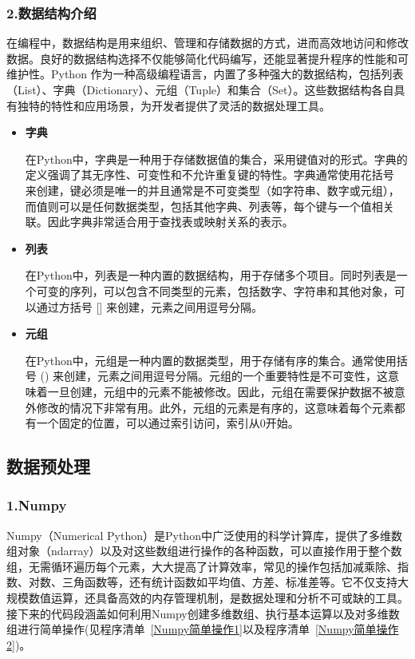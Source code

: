 \subsubsection{2.数据结构介绍}

在编程中，数据结构是用来组织、管理和存储数据的方式，进而高效地访问和修改数据。良好的数据结构选择不仅能够简化代码编写，还能显著提升程序的性能和可维护性。Python 作为一种高级编程语言，内置了多种强大的数据结构，包括列表（List）、字典（Dictionary）、元组（Tuple）和集合（Set）。这些数据结构各自具有独特的特性和应用场景，为开发者提供了灵活的数据处理工具。

\begin{itemize}
\item \textbf{字典}

在Python中，字典是一种用于存储数据值的集合，采用键值对的形式。字典的定义强调了其无序性、可变性和不允许重复键的特性。字典通常使用花括号 {} 来创建，键必须是唯一的并且通常是不可变类型（如字符串、数字或元组），而值则可以是任何数据类型，包括其他字典、列表等，每个键与一个值相关联。因此字典非常适合用于查找表或映射关系的表示。

\item \textbf{列表}

在Python中，列表是一种内置的数据结构，用于存储多个项目。同时列表是一个可变的序列，可以包含不同类型的元素，包括数字、字符串和其他对象，可以通过方括号 [] 来创建，元素之间用逗号分隔。

\item \textbf{元组}

在Python中，元组是一种内置的数据类型，用于存储有序的集合。通常使用括号 () 来创建，元素之间用逗号分隔。元组的一个重要特性是不可变性，这意味着一旦创建，元组中的元素不能被修改。因此，元组在需要保护数据不被意外修改的情况下非常有用。此外，元组的元素是有序的，这意味着每个元素都有一个固定的位置，可以通过索引访问，索引从0开始。
\end{itemize}


\subsection{数据预处理}

\subsubsection{1.Numpy}

Numpy（Numerical Python）是Python中广泛使用的科学计算库，提供了多维数组对象（ndarray）以及对这些数组进行操作的各种函数，可以直接作用于整个数组，无需循环遍历每个元素，大大提高了计算效率，常见的操作包括加减乘除、指数、对数、三角函数等，还有统计函数如平均值、方差、标准差等。它不仅支持大规模数值运算，还具备高效的内存管理机制，是数据处理和分析不可或缺的工具。接下来的代码段涵盖如何利用Numpy创建多维数组、执行基本运算以及对多维数组进行简单操作(见程序清单~\ref{Numpy简单操作1}以及程序清单~\ref{Numpy简单操作2})。

